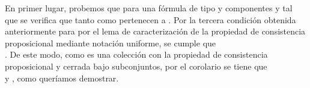 \begin{isabellebody}
\begin{isamarkuptext}
\begin{demostracion}
    En primer lugar, probemos que para una fórmula  de tipo \isa{{\isasymalpha}} y componentes  y  tal que 
     se verifica que tanto  como  pertenecen a . Por la tercera condición 
    obtenida anteriormente para  por el lema de caracterización de la propiedad de consistencia 
    proposicional mediante notación uniforme, se cumple que\\ . De este modo, como 
     es una colección con la propiedad de consistencia proposicional y cerrada bajo subconjuntos, 
    por el corolario  se tiene que\\  y , como queríamos demostrar.


\end{demostracion}
\end{isamarkuptext}
\end{isabellebody}
